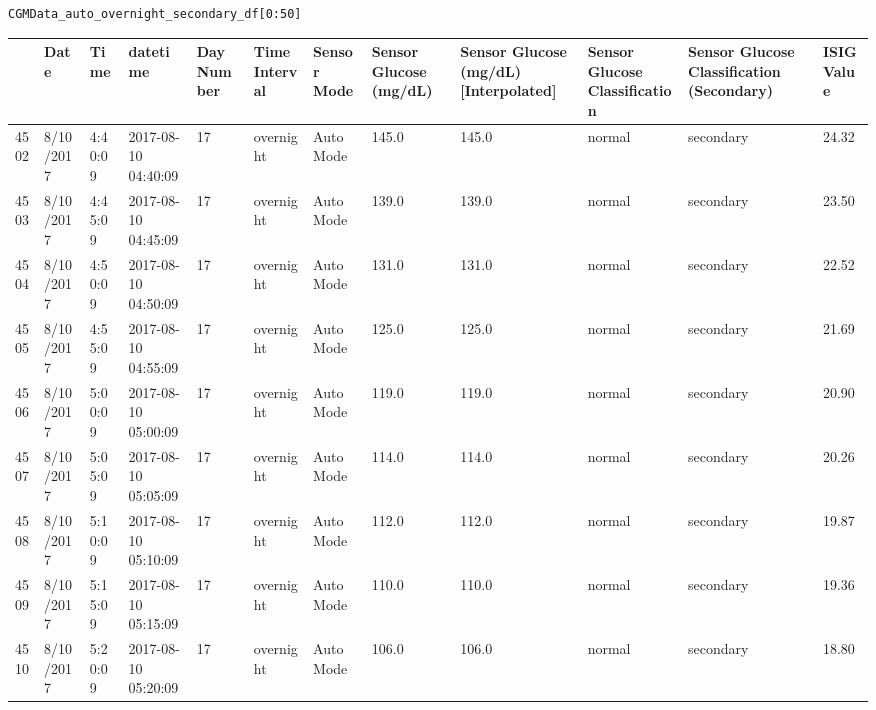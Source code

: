 \bigskip

\begin{verbatim}
CGMData_auto_overnight_secondary_df[0:50]
\end{verbatim}

\bigskip\noindent
\begin{tabular}{p{}p{}p{}p{}p{}p{}p{}p{}p{}p{}p{}p{}}
\toprule
 & Date & Time & datetime & Day Number & Time Interval & Sensor Mode & Sensor Glucose (mg/dL) & Sensor Glucose (mg/dL) [Interpolated] & Sensor Glucose Classification & Sensor Glucose Classification (Secondary) & ISIG Value \\
\hline
4502 & 8/10/2017 & 4:40:09 & 2017-08-10 04:40:09 & 17 & overnight & Auto Mode & 145.0 & 145.0 & normal & secondary & 24.32 \\
\hline
4503 & 8/10/2017 & 4:45:09 & 2017-08-10 04:45:09 & 17 & overnight & Auto Mode & 139.0 & 139.0 & normal & secondary & 23.50 \\
\hline
4504 & 8/10/2017 & 4:50:09 & 2017-08-10 04:50:09 & 17 & overnight & Auto Mode & 131.0 & 131.0 & normal & secondary & 22.52 \\
\hline
4505 & 8/10/2017 & 4:55:09 & 2017-08-10 04:55:09 & 17 & overnight & Auto Mode & 125.0 & 125.0 & normal & secondary & 21.69 \\
\hline
4506 & 8/10/2017 & 5:00:09 & 2017-08-10 05:00:09 & 17 & overnight & Auto Mode & 119.0 & 119.0 & normal & secondary & 20.90 \\
\hline
4507 & 8/10/2017 & 5:05:09 & 2017-08-10 05:05:09 & 17 & overnight & Auto Mode & 114.0 & 114.0 & normal & secondary & 20.26 \\
\hline
4508 & 8/10/2017 & 5:10:09 & 2017-08-10 05:10:09 & 17 & overnight & Auto Mode & 112.0 & 112.0 & normal & secondary & 19.87 \\
\hline
4509 & 8/10/2017 & 5:15:09 & 2017-08-10 05:15:09 & 17 & overnight & Auto Mode & 110.0 & 110.0 & normal & secondary & 19.36 \\
\hline
4510 & 8/10/2017 & 5:20:09 & 2017-08-10 05:20:09 & 17 & overnight & Auto Mode & 106.0 & 106.0 & normal & secondary & 18.80 \\

\end{tabular}
